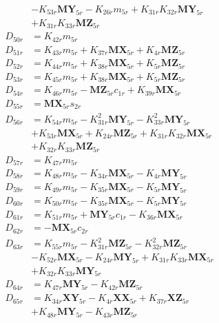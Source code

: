 \begin{multicols}{2}
\begin{align}
&- K_{53r}\mathbf{MY}_{5r} - K_{26r}m_{5r} + K_{31r}K_{32r}\mathbf{MY}_{5r}  \nonumber \\
&+ K_{31r}K_{33r}\mathbf{MZ}_{5r} \nonumber \\
D_{50r} &= K_{42r}m_{5r} \nonumber \\
D_{51r} &= K_{43r}m_{5r} + K_{37r}\mathbf{MX}_{5r} + K_{4r}\mathbf{MZ}_{5r} \nonumber \\
D_{52r} &= K_{44r}m_{5r} + K_{38r}\mathbf{MX}_{5r} + K_{5r}\mathbf{MZ}_{5r} \nonumber \\
D_{53r} &= K_{45r}m_{5r} + K_{38r}\mathbf{MX}_{5r} + K_{5r}\mathbf{MZ}_{5r} \nonumber \\
D_{54r} &= K_{46r}m_{5r} - \mathbf{MZ}_{5r}c_{1r} + K_{39r}\mathbf{MX}_{5r} \nonumber \\
D_{55r} &= \mathbf{MX}_{5r}s_{2r} \nonumber \\
D_{56r} &= K_{54r}m_{5r} - K_{31r}^2\mathbf{MY}_{5r} - K_{33r}^2\mathbf{MY}_{5r}  \nonumber \\
&+ K_{53r}\mathbf{MX}_{5r} + K_{24r}\mathbf{MZ}_{5r} + K_{31r}K_{32r}\mathbf{MX}_{5r}  \nonumber \\
&+ K_{32r}K_{33r}\mathbf{MZ}_{5r} \nonumber \\
D_{57r} &= K_{47r}m_{5r} \nonumber \\
D_{58r} &= K_{48r}m_{5r} - K_{34r}\mathbf{MX}_{5r} - K_{4r}\mathbf{MY}_{5r} \nonumber \\
D_{59r} &= K_{49r}m_{5r} - K_{35r}\mathbf{MX}_{5r} - K_{5r}\mathbf{MY}_{5r} \nonumber \\
D_{60r} &= K_{50r}m_{5r} - K_{35r}\mathbf{MX}_{5r} - K_{5r}\mathbf{MY}_{5r} \nonumber \\
D_{61r} &= K_{51r}m_{5r} + \mathbf{MY}_{5r}c_{1r} - K_{36r}\mathbf{MX}_{5r} \nonumber \\
D_{62r} &= -\mathbf{MX}_{5r}c_{2r} \nonumber \\
D_{63r} &= K_{55r}m_{5r} - K_{31r}^2\mathbf{MZ}_{5r} - K_{32r}^2\mathbf{MZ}_{5r}  \nonumber \\
&- K_{52r}\mathbf{MX}_{5r} - K_{24r}\mathbf{MY}_{5r} + K_{31r}K_{33r}\mathbf{MX}_{5r}  \nonumber \\
&+ K_{32r}K_{33r}\mathbf{MY}_{5r} \nonumber \\
D_{64r} &= K_{47r}\mathbf{MY}_{5r} - K_{42r}\mathbf{MZ}_{5r} \nonumber \\
D_{65r} &= K_{34r}\mathbf{XY}_{5r} - K_{4r}\mathbf{XX}_{5r} + K_{37r}\mathbf{XZ}_{5r}  \nonumber \\
&+ K_{48r}\mathbf{MY}_{5r} - K_{43r}\mathbf{MZ}_{5r} \nonumber \\

\end{align}
\end{multicols}
